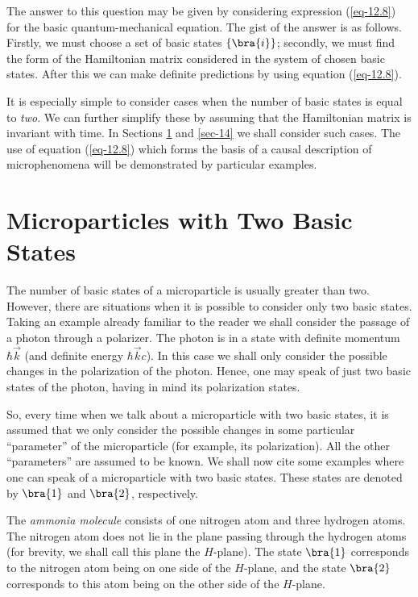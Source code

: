 \documentclass[a4paper,sfsidenotes,colorlinks=true]{tufte-book}
\numberwithin{equation}{section}
\numberwithin{figure}{section}
\begin{document}
The answer to this question may be given
by considering expression (\ref{eq-12.8}) for the basic
quantum-mechanical equation. The gist of the answer is as
follows. Firstly, we must choose a set of basic states $\left\{
  \bra{i} \right\}$; secondly, we must find the form of the
Hamiltonian matrix considered in the system of chosen basic
states. After this we can make definite predictions by using equation
(\ref{eq-12.8}). 

It is especially simple to consider cases when the number of basic
states is equal to \emph{two}. We can further simplify these by
assuming that the Hamiltonian matrix is invariant with time. In
Sections \ref{sec-13} and \ref{sec-14} we shall consider such
cases. The use of equation (\ref{eq-12.8}) which forms the basis of a
causal description of microphenomena will be demonstrated by
particular examples.

\section{Microparticles with Two Basic States}
\label{sec-13}
The number of basic states of a microparticle is usually greater
than two. However, there are situations when it is possible to
consider only two basic states. Taking an example already familiar to
the reader we shall consider the passage of a photon through a
polarizer. The photon is in a state with definite momentum $\hbar
\vec{k}$ (and definite energy $\hbar \vec{k} c$). In this case we
shall only consider the possible changes in the polarization of the
photon. Hence, one may speak of just two basic states of the photon,
having in mind its polarization states.

So, every time when we talk about a microparticle with two basic
states, it is assumed that we only consider the possible changes in
some particular ``parameter'' of the microparticle (for example, its
polarization). All the other ``parameters'' are assumed to be known. We
shall now cite some examples where one can speak of a microparticle
with two basic states. These states are denoted by $\bra{1}$ and  $\bra{2}$,
respectively.

The \emph{ammonia molecule} consists of one nitrogen atom and three
hydrogen atoms. The nitrogen atom does not lie in the plane passing
through the hydrogen atoms (for brevity, we shall call this plane the
$H$-plane). The state $\bra{1}$ corresponds to the nitrogen atom being
on one side of the $H$-plane, and the state $\bra{2}$ corresponds to
this atom being on the other side of the $H$-plane.
\end{document}
